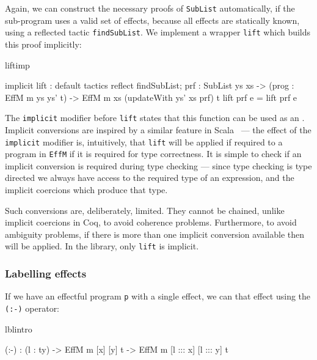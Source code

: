 \noindent
Again, we can construct the necessary proofs of \texttt{SubList} automatically,
if the sub-program uses a valid set of effects, because all effects are
statically known, using a reflected tactic \texttt{findSubList}. We implement
a wrapper \texttt{lift} which builds this proof implicitly:

\begin{SaveVerbatim}{liftimp}

implicit
lift : {default tactics { 
                   reflect findSubList;  
                }
          prf : SubList ys xs} ->
       (prog : EffM m ys ys' t) -> 
       EffM m xs (updateWith ys' xs prf) t
lift {prf} e = lift prf e

\end{SaveVerbatim}

\noindent
The \texttt{implicit} modifier before \texttt{lift} states that this function
can be used as an . Implicit conversions are inspired
by a similar feature in Scala~\cite{Scala} --- the effect of the \texttt{implicit}
modifier is, intuitively, that \texttt{lift} will be applied if required to
a program in \texttt{EffM} if it is required for type correctness. It is
simple to check if an implicit conversion is required during type 
checking --- since type checking is type directed we always have access to the
required type of an expression, and the implicit coercions which produce
that type.

Such conversions are, deliberately, limited. They cannot be chained, unlike
implicit coercions in Coq, to avoid coherence problems. Furthermore, to avoid
ambiguity problems, if there is more than one implicit conversion available
then  will be applied. In the \Eff{} library, only \texttt{lift}
is implicit.

\subsubsection{Labelling effects}

If we have an effectful program \texttt{p} with a single effect, we can 
 that effect using the \texttt{(:-)} operator:

\begin{SaveVerbatim}{lblintro}

(:-)  : (l : ty) -> 
        EffM m [x] [y] t -> 
        EffM m [l ::: x] [l ::: y] t

\end{SaveVerbatim}

